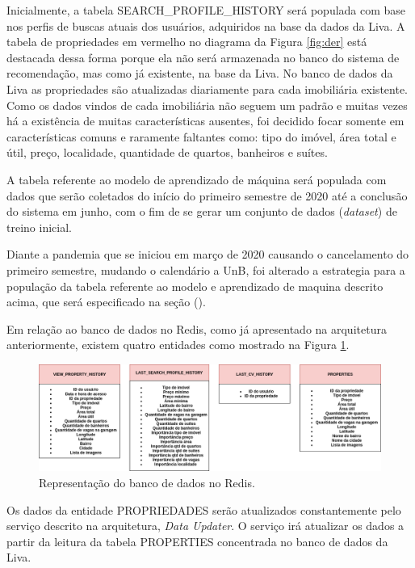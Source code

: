 Inicialmente, a tabela SEARCH\_PROFILE\_HISTORY será populada com base nos perfis de buscas atuais dos usuários, adquiridos na base da dados da Liva. A tabela de propriedades em vermelho no diagrama da Figura \ref{fig:der} está destacada dessa forma porque ela não será armazenada no banco do sistema de recomendação, mas como já existente, na base da Liva. No banco de dados da Liva as propriedades são atualizadas diariamente para cada imobiliária existente. Como os dados vindos de cada imobiliária não seguem um padrão e muitas vezes há a existência de muitas características ausentes, foi decidido focar somente em características comuns e raramente faltantes como: tipo do imóvel, área total e útil, preço, localidade, quantidade de quartos, banheiros e suítes.

A tabela referente ao modelo de aprendizado de máquina será populada com dados que serão coletados do início do primeiro semestre de 2020 até a conclusão do sistema em junho, com o fim de se gerar um conjunto de dados (\textit{dataset}) de treino inicial.

Diante a pandemia que se iniciou em março de 2020 causando o cancelamento do primeiro semestre, mudando o calendário a UnB, foi alterado a estrategia para a população da tabela referente ao modelo e aprendizado de maquina descrito acima, que será especificado na seção ().

Em relação ao banco de dados no Redis, como já apresentado na arquitetura anteriormente, existem quatro entidades como mostrado na Figura \ref{fig:redis}.

\begin{figure}[H]
    \centering
    \includegraphics[scale=0.4]{figuras/proposta/redis.png}
    \caption[Representação do banco de dados no Redis]{Representação do banco de dados no Redis.}
    \label{fig:redis}
\end{figure}

Os dados da entidade PROPRIEDADES serão atualizados constantemente pelo serviço descrito na arquitetura, \textit{Data Updater}. O serviço irá atualizar os dados a partir da leitura da tabela PROPERTIES concentrada no banco de dados da Liva.

